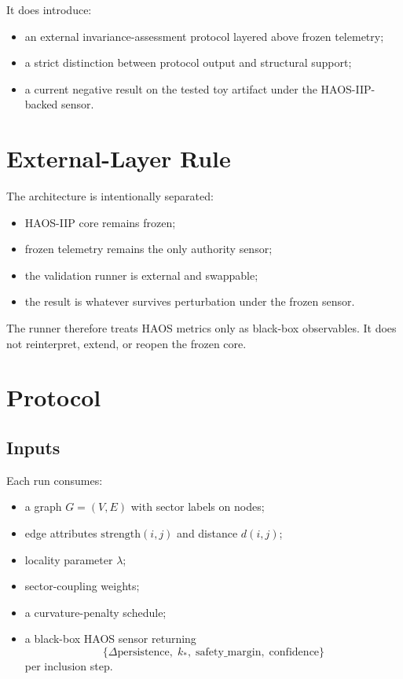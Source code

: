 \documentclass[11pt]{article}
\begin{document}
It does introduce:
\begin{itemize}
\item an external invariance-assessment protocol layered above frozen telemetry;
\item a strict distinction between protocol output and structural support;
\item a current negative result on the tested toy artifact under the HAOS-IIP-backed sensor.
\end{itemize}

\section{External-Layer Rule}

The architecture is intentionally separated:
\begin{itemize}
\item HAOS-IIP core remains frozen;
\item frozen telemetry remains the only authority sensor;
\item the validation runner is external and swappable;
\item the result is whatever survives perturbation under the frozen sensor.
\end{itemize}

The runner therefore treats HAOS metrics only as black-box observables. It does not reinterpret, extend, or reopen the frozen core.

\section{Protocol}

\subsection{Inputs}

Each run consumes:
\begin{itemize}
\item a graph \(G = (V,E)\) with sector labels on nodes;
\item edge attributes \(\mathrm{strength}(i,j)\) and distance \(d(i,j)\);
\item locality parameter \(\lambda\);
\item sector-coupling weights;
\item a curvature-penalty schedule;
\item a black-box HAOS sensor returning
\[
\{\Delta \mathrm{persistence},\; k_{\ast},\; \mathrm{safety\_margin},\; \mathrm{confidence}\}
\]
per inclusion step.
\end{itemize}
\end{document}
